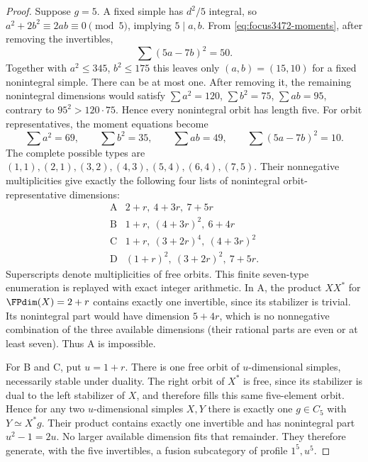 \begin{proof}
Suppose $g=5$. A fixed simple has $d^2/5$ integral, so
$a^2+2b^2\equiv 2ab\equiv0\pmod5$, implying $5\mid a,b$.
From \eqref{eq:focus3472-moments}, after removing the invertibles,
\[
 \sum(5a-7b)^2=50.
\]
Together with $a^2\leq345$, $b^2\leq175$ this leaves only
$(a,b)=(15,10)$ for a fixed nonintegral simple. There can be at most
one. After removing it, the remaining nonintegral dimensions would
satisfy $\sum a^2=120$, $\sum b^2=75$, $\sum ab=95$, contrary to
$95^2>120\cdot75$. Hence every nonintegral orbit has length five.
For orbit representatives, the moment equations become
\[
 \sum a^2=69,\qquad\sum b^2=35,\qquad\sum ab=49,
 \qquad\sum(5a-7b)^2=10.
\]
The complete possible types are
$(1,1),(2,1),(3,2),(4,3),(5,4),(6,4),(7,5)$.
Their nonnegative multiplicities give exactly the following four
lists of nonintegral orbit-representative dimensions:
\[
\begin{array}{c|l}
 \mathrm A&2+r,\ 4+3r,\ 7+5r\\
 \mathrm B&1+r,\ (4+3r)^2,\ 6+4r\\
 \mathrm C&1+r,\ (3+2r)^4,\ (4+3r)^2\\
 \mathrm D&(1+r)^2,\ (3+2r)^2,\ 7+5r.
\end{array}
\]
Superscripts denote multiplicities of free orbits. This finite
seven-type enumeration is replayed with exact integer arithmetic.
In A, the product $XX^*$ for $\FPdim(X)=2+r$ contains exactly one
invertible, since its stabilizer is trivial. Its nonintegral part
would have dimension $5+4r$, which is no nonnegative combination of
the three available dimensions (their rational parts are even or
at least seven). Thus A is impossible.

For B and C, put $u=1+r$. There is one free orbit of $u$-dimensional
simples, necessarily stable under duality. The right orbit of $X^*$
is free, since its stabilizer is dual to the left stabilizer of $X$,
and therefore fills this same five-element orbit. Hence for any two
$u$-dimensional simples $X,Y$ there is exactly one $g\in C_5$ with
$Y\simeq X^*g$. Their product contains exactly one invertible
and has nonintegral part $u^2-1=2u$. No larger available dimension
fits that remainder. They therefore generate, with the five
invertibles, a fusion subcategory of profile $1^5,u^5$.


\end{proof}
